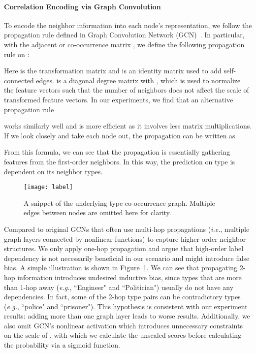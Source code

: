\documentclass[11pt,a4paper]{article}
\begin{document}
\paragraph{Correlation Encoding via Graph Convolution}
To encode the neighbor information into each node's representation, we follow the propagation rule defined in Graph Convolution Network (GCN)~\cite{gcn}. In particular, with the adjacent or co-occurrence matrix , we define the following propagation rule on :

Here  is the transformation matrix and  is an identity matrix used to add self-connected edges.  is a diagonal degree matrix with , which is used to normalize the feature vectors such that the number of neighbors does not affect the scale of transformed feature vectors. In our experiments, we find that an alternative propagation rule

works similarly well and is more efficient as it involves less matrix multiplications. If we look closely and take each node out, the propagation can be written as

From this formula, we can see that the propagation is essentially gathering features from the first-order neighbors. In this way, the prediction on type  is dependent on its neighbor types. 
\begin{figure}[t]
\centering
\texttt{[image: label]}
\caption{A snippet of the underlying type co-occurrence graph. Multiple edges between nodes are omitted here for clarity.}
\label{label}
\end{figure}

Compared to original GCNs that often use multi-hop propagations (\emph{i.e.}, multiple graph layers connected by nonlinear functions) to capture higher-order neighbor structures. We only apply one-hop propagation and argue that high-order label dependency is not necessarily beneficial in our scenario and might introduce false bias. A simple illustration is shown in Figure~\ref{label}. We can see that propagating 2-hop information introduces undesired inductive bias, since types that are more than 1-hop away (\emph{e.g.}, ``Engineer" and ``Politician") usually do not have any dependencies. In fact, some of the 2-hop type pairs can be contradictory types (\emph{e.g.}, ``police" and ``prisoner"). This hypothesis is consistent with our experiment results: adding more than one graph layer leads to worse results. Additionally, we also omit GCN's nonlinear activation which introduces unnecessary constraints on the scale of , with which we calculate the unscaled scores before calculating the probability via a sigmoid function.
\end{document}
